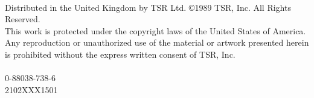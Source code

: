 \documentclass[../main.tex]{subfiles}
\begin{document}
\\
Distributed in the United Kingdom by TSR Ltd. ©1989 TSR, Inc. All Rights Reserved.\\
This work is protected under the copyright laws of the United States of America. Any reproduction or unauthorized use of the material or artwork presented herein is prohibited without the express written consent of TSR, Inc.\\

\\
0-88038-738-6\\
2102XXX1501
\end{document}
